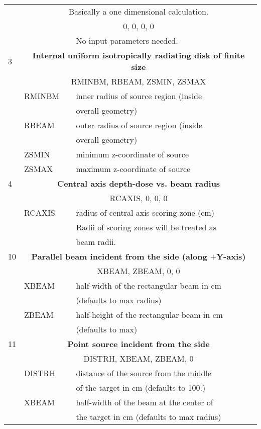 \begin{longtable}{lll}
  & \multicolumn{2}{c}{Basically a one dimensional calculation.} \\
  & \multicolumn{2}{c}{      0, 0, 0, 0} \\
 & & No input parameters needed.\\
\hline
3 & \multicolumn{2}{c}{\bf Internal uniform isotropically radiating disk of finite size}\\
  & \multicolumn{2}{c}{      RMINBM, RBEAM, ZSMIN, ZSMAX}\\
  & RMINBM  & inner radius of source region (inside\\
  &         & overall geometry)\\
  & RBEAM   & outer radius of source region (inside\\
  &         & overall geometry)\\
  & ZSMIN   & minimum z-coordinate of source \\
  & ZSMAX   & maximum z-coordinate of source \\
\hline
4 & \multicolumn{2}{c}{\bf Central axis depth-dose vs. beam radius}\\
  & \multicolumn{2}{c}{      RCAXIS, 0, 0, 0}\\
  & RCAXIS  & radius of central axis scoring zone (cm) \\
  &         & Radii of scoring zones will be treated as\\
  &         & beam radii.\\
\hline
10& \multicolumn{2}{c}{\bf Parallel beam incident from the side (along $+$Y-axis)}\\
  & \multicolumn{2}{c}{      XBEAM, ZBEAM, 0, 0}\\
  & XBEAM   & half-width of the rectangular beam in cm\\
  &                & (defaults to max radius)\\
  & ZBEAM   & half-height of the rectangular beam in cm\\
  &                & (defaults to max)\\
\hline
11&\multicolumn{2}{c}{\bf Point source incident from the side}\\
  &\multicolumn{2}{c}{      DISTRH, XBEAM, ZBEAM, 0}\\
  &DISTRH   & distance of the source from the middle\\
  &                & of the target in cm (defaults to 100.)\\
  &XBEAM    & half-width of the beam at the center of\\
  &                & the target in cm (defaults to max radius)\\

\end{longtable}
